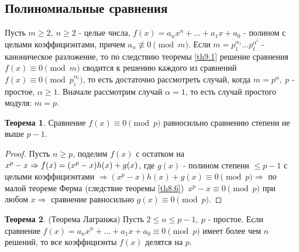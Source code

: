 \documentclass[a4paper, 12pt]{article}
\theoremstyle{definition}
\newtheorem{theorem}{Теорема}[section]
\begin{document}
    \subsection*{Полиномиальные сравнения}
    Пусть $m\geq 2,\ n\geq 2$ - целые числа, $f(x)=a_n x^n+\dots+a_1 x+a_0$ - полином с целыми коэффициэнтами, причем $a_n\not\equiv 0\pmod{m}$. Если $m=p_1^{\alpha_1}\dots p_t^{\alpha^t}$ - каноническое разложение, то по следствию теоремы \ref{th9.1} решение сравнения\\
    $f(x)\equiv 0\pmod{m}$ сводится к решению каждого из сравнений $f(x)\equiv 0\pmod{p_i^{\alpha_i}}$, то есть достаточно рассмотреть случай, когда $m=p^{\alpha},\ p$ - простое, $\alpha\geq 1$. Вначале рассмотрим случай $\alpha=1$, то есть случай простого модуля: $m=p$.
    \begin{theorem}\label{th9.4}
        Сравнение $f(x)\equiv 0\pmod{p}$ равносильно сравнению степени не выше $p-1$.
    \end{theorem} 
    \begin{proof}
        Пусть $n\geq p$, поделим $f(x)$ с остатком на $x^p-x\\
        \Rightarrow f(x)=(x^p-x)h(x)+g(x)$, где $g(x)$ - полином степени $\leq p-1$ с целыми коэффициэнтами $\Rightarrow (x^p-x)h(x)+g(x)\equiv 0\pmod{p} \Rightarrow$ по малой теореме Ферма (следствие теоремы \ref{th8.6})\ $x^p-x\equiv 0 \pmod{p}$ при любом $x \Rightarrow$ сравнение равносильно $g(x)\equiv 0\pmod{p}$.
    \end{proof} 
    \begin{theorem} (Теорема Лагранжа) \label{th9.5}
        Пусть $2\leq n\leq p-1,\ p$ - простое. Если сравнение $f(x)=a_n x^n+\dots+a_1 x+a_0\equiv 0\pmod{p}$ имеет более чем $n$ решений, то все коэффициэнты $f(x)$ делятся на $p$.
    \end{theorem} 
\end{document}
